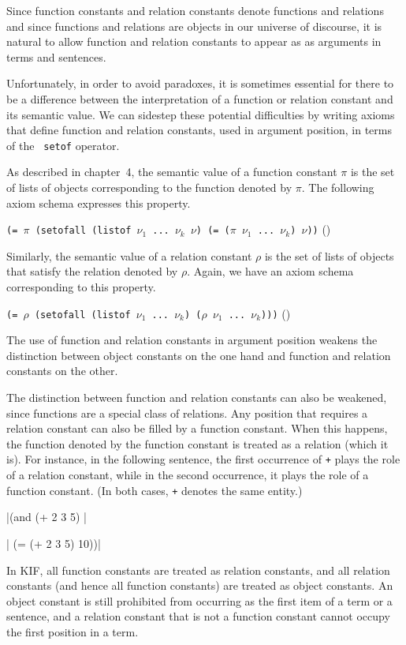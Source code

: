 Since function constants and relation constants denote functions and
relations and since functions and relations are objects in our
universe of discourse, it is natural to allow function and relation
constants to appear as as arguments in terms and sentences.

Unfortunately, in order to avoid paradoxes, it is sometimes essential
for there to be a difference between the interpretation of a function or
relation constant and its semantic value.  We can sidestep these
potential difficulties by writing axioms that define function and
relation constants, used in argument position, in terms of the {\tt
setof} operator.

As described in chapter~4, the semantic value of a function constant $\pi$ is
the set of lists of objects corresponding to the function denoted by $\pi$. 
The following axiom schema expresses this property.

\medskip
{\tt (= $\pi$ (setofall (listof $\nu_1$ ... $\nu_k$ $\nu$) (= ($\pi$ $\nu_1$
... $\nu_k$) $\nu$))} 
\hfill(\equation)
\medskip

Similarly, the semantic value of a relation constant $\rho$ is the set of
lists of objects that satisfy the relation denoted by $\rho$.  Again, we
have an axiom schema corresponding to this property.

\medskip
{\tt (= $\rho$ (setofall (listof $\nu_1$ ... $\nu_k$) ($\rho$ $\nu_1$ ...
$\nu_k$)))} \hfill(\equation)
\medskip

The use of function and relation constants in argument position weakens
the distinction between object constants on the one hand and function
and relation constants on the other.

The distinction between function and relation constants can also be
weakened, since functions are a special class of relations.  Any
position that requires a relation constant can also be filled by a
function constant.  When this happens, the function denoted by the
function constant is treated as a relation (which it is).  For instance,
in the following sentence, the first occurrence of {\tt +} plays the
role of a relation constant, while in the second occurrence, it plays
the role of a function constant.  (In both cases, {\tt +} denotes the
same entity.)  

\medskip
\verbatim|(and (+ 2 3 5) |\par
\verbatim|     (= (+ 2 3 5) 10))|\par
\medskip

In KIF, all function constants are treated as relation constants,
and all relation constants (and hence all function constants) are
treated as object constants.  An object constant is still prohibited from
occurring as the first item of a term or a sentence, and a relation constant
that is not a function constant cannot occupy the first position in a term.

